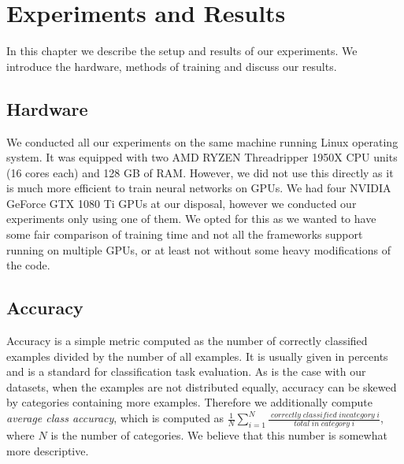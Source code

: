 \chapter{Experiments and Results}
\label{sec:chap5}
In this chapter we describe the setup and results of our experiments. We introduce the hardware, methods of training and discuss our results.

\section{Hardware}
We conducted all our experiments on the same machine running Linux operating system. It was equipped with two AMD RYZEN Threadripper 1950X CPU units (16 cores each) and 128 GB of RAM. However, we did not use this directly as it is much more efficient to train neural networks on GPUs. We had four NVIDIA GeForce GTX 1080 Ti GPUs at our disposal, however we conducted our experiments only using one of them. We opted for this as we wanted to have some fair comparison of training time and not all the frameworks support running on multiple GPUs, or at least not without some heavy modifications of the code. 

\section{Accuracy}
Accuracy is a simple metric computed as the number of correctly classified examples divided by the number of all examples. It is usually given in percents and is a standard for classification task evaluation. As is the case with our datasets, when the examples are not distributed equally, accuracy can be skewed by categories containing more examples. Therefore we additionally compute \textit{average class accuracy}, which is computed as $\frac{1}{N}\sum_{i=1}^{N} {\frac{\;correctly\;classified\;in category\;i}{total\;in\;category\;i}} $, where $N$ is the number of categories. We believe that this number is somewhat more descriptive. 

